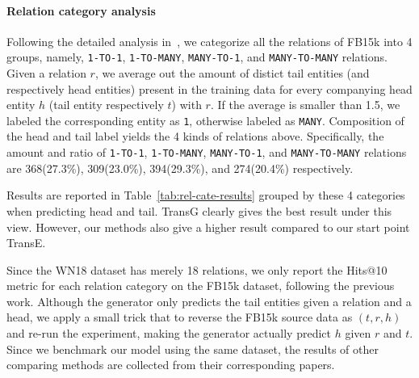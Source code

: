 \documentclass[twocolumn,a4paper,preprint,10pt,3p]{elsarticle}
\begin{document}
\paragraph{Relation category analysis} Following the detailed analysis in~\cite{TransE2013}, we categorize all the  relations of FB15k into 4 groups, namely, \texttt{1-TO-1}, \texttt{1-TO-MANY}, \texttt{MANY-TO-1}, and \texttt{MANY-TO-MANY} relations. Given a relation $r$, we average out the amount of distict tail entities (and respectively head entities) present in the training data for every companying head entity $h$ (tail entity respectively $t$) with $r$. If the average is smaller than 1.5, we labeled the corresponding entity as \texttt{1}, otherwise labeled as \texttt{MANY}. Composition of the head and tail label yields the 4 kinds of relations above. Specifically, the amount and ratio of \texttt{1-TO-1}, \texttt{1-TO-MANY}, \texttt{MANY-TO-1}, and \texttt{MANY-TO-MANY} relations are 368(27.3\%), 309(23.0\%), 394(29.3\%), and 274(20.4\%) respectively.

Results are reported in Table~{\ref{tab:rel-cate-results}} grouped by these 4 categories when predicting head and tail. TransG clearly gives the best result under this view. However, our methods also give a higher result compared to our start point TransE.

Since the WN18 dataset has merely 18 relations, we only report the Hits@10 metric for each relation category on the FB15k dataset, following the previous work. Although the generator only predicts the tail entities given a relation and a head, we apply a small trick that to reverse the FB15k source data as $(t, r, h)$ and re-run the experiment, making the generator actually predict $h$ given $r$ and $t$. Since we benchmark our model using the same dataset, the results of other comparing methods are collected from their corresponding papers.
\end{document}
